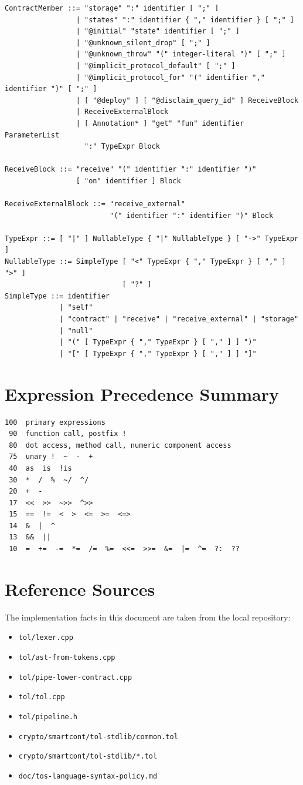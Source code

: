 \documentclass[12pt,oneside]{article}
\begin{document}
\begin{verbatim}
ContractMember ::= "storage" ":" identifier [ ";" ]
                 | "states" ":" identifier { "," identifier } [ ";" ]
                 | "@initial" "state" identifier [ ";" ]
                 | "@unknown_silent_drop" [ ";" ]
                 | "@unknown_throw" "(" integer-literal ")" [ ";" ]
                 | "@implicit_protocol_default" [ ";" ]
                 | "@implicit_protocol_for" "(" identifier "," identifier ")" [ ";" ]
                 | [ "@deploy" ] [ "@disclaim_query_id" ] ReceiveBlock
                 | ReceiveExternalBlock
                 | [ Annotation* ] "get" "fun" identifier ParameterList
                   ":" TypeExpr Block

ReceiveBlock ::= "receive" "(" identifier ":" identifier ")"
                 [ "on" identifier ] Block

ReceiveExternalBlock ::= "receive_external"
                         "(" identifier ":" identifier ")" Block

TypeExpr ::= [ "|" ] NullableType { "|" NullableType } [ "->" TypeExpr ]
NullableType ::= SimpleType [ "<" TypeExpr { "," TypeExpr } [ "," ] ">" ]
                            [ "?" ]
SimpleType ::= identifier
             | "self"
             | "contract" | "receive" | "receive_external" | "storage"
             | "null"
             | "(" [ TypeExpr { "," TypeExpr } [ "," ] ] ")"
             | "[" [ TypeExpr { "," TypeExpr } [ "," ] ] "]"
\end{verbatim}

\section{Expression Precedence Summary}
\begin{verbatim}
100  primary expressions
 90  function call, postfix !
 80  dot access, method call, numeric component access
 75  unary !  ~  -  +
 40  as  is  !is
 30  *  /  %  ~/  ^/
 20  +  -
 17  <<  >>  ~>>  ^>>
 15  ==  !=  <  >  <=  >=  <=>
 14  &  |  ^
 13  &&  ||
 10  =  +=  -=  *=  /=  %=  <<=  >>=  &=  |=  ^=  ?:  ??
\end{verbatim}

\section{Reference Sources}
The implementation facts in this document are taken from the local repository:

\begin{itemize}
\item \verb|tol/lexer.cpp|
\item \verb|tol/ast-from-tokens.cpp|
\item \verb|tol/pipe-lower-contract.cpp|
\item \verb|tol/tol.cpp|
\item \verb|tol/pipeline.h|
\item \verb|crypto/smartcont/tol-stdlib/common.tol|
\item \verb|crypto/smartcont/tol-stdlib/*.tol|
\item \verb|doc/tos-language-syntax-policy.md|
\end{itemize}
\end{document}
